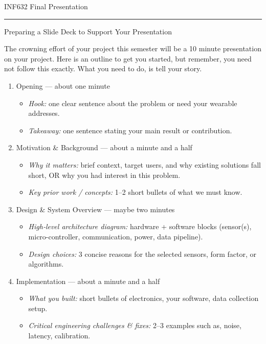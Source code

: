 \documentclass[11pt]{article}
\begin{document}
\Huge INF632 Final Presentation
\normalsize ~

\noindent\rule{\textwidth}{1pt}\vspace{.5em}

\LARGE Preparing a Slide Deck to Support Your Presentation
\normalsize ~

The crowning effort of your project this semester will be a 10 minute presentation on your project.  Here is an outline to get you started, but remember, you need not follow this exactly.  What you need to do, is tell your story.

\begin{enumerate}
	\item Opening — about one minute
	\begin{itemize}
		\item {\em Hook:} one clear sentence about the problem or need your wearable addresses.
		\item {\em Takeaway:} one sentence stating your main result or contribution.
	\end{itemize}
	\item Motivation \& Background — about a minute and a half
	\begin{itemize}
		\item {\em Why it matters:} brief context, target users, and why existing solutions fall short, OR why you had interest in this problem.
		\item {\em Key prior work / concepts:} 1–2 short bullets of what we must know.
	\end{itemize}
	\item Design \& System Overview — maybe two minutes
	\begin{itemize}
		\item {\em High‑level architecture diagram:} hardware + software blocks (sensor(s), micro-controller, communication, power, data pipeline).
		\item {\em Design choices:} 3 concise reasons for the selected sensors, form factor, or algorithms.
	\end{itemize}
	\item Implementation — about a minute and a half
	\begin{itemize}
		\item {\em What you built:} short bullets of electronics, your software, data collection setup.
		\item {\em Critical engineering challenges \& fixes:} 2–3 examples such as, noise, latency, calibration.
	\end{itemize}

\end{enumerate}
\end{document}
